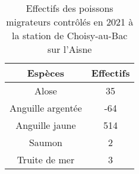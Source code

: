\begin{table}[H]
\centering
\caption{Effectifs des poissons migrateurs contrôlés en 2021 à la station de Choisy-au-Bac sur l'Aisne} 
\label{mig_caran}
\begin{tabular}{cc}
  \hline
Espèces & Effectifs \\ 
  \hline
Alose &  35 \\ 
  Anguille argentée & -64 \\ 
  Anguille jaune & 514 \\ 
  Saumon &   2 \\ 
  Truite de mer &   3 \\ 
   \hline
\end{tabular}
\end{table}
